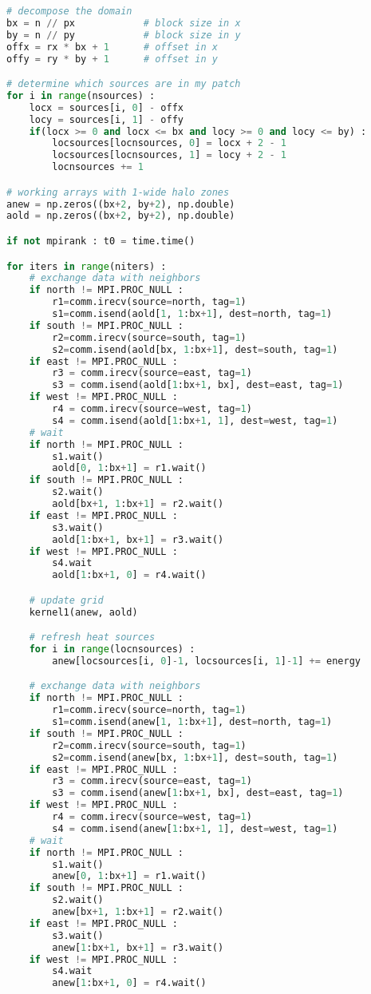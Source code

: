 \begin{lstlisting}[language=Python, caption={Parallel Numba-CPU implementation of the stencil test case.}]
# decompose the domain
bx = n // px            # block size in x
by = n // py            # block size in y
offx = rx * bx + 1      # offset in x
offy = ry * by + 1      # offset in y

# determine which sources are in my patch
for i in range(nsources) :
    locx = sources[i, 0] - offx
    locy = sources[i, 1] - offy
    if(locx >= 0 and locx <= bx and locy >= 0 and locy <= by) :
        locsources[locnsources, 0] = locx + 2 - 1
        locsources[locnsources, 1] = locy + 2 - 1
        locnsources += 1

# working arrays with 1-wide halo zones
anew = np.zeros((bx+2, by+2), np.double)
aold = np.zeros((bx+2, by+2), np.double)

if not mpirank : t0 = time.time()

for iters in range(niters) :
    # exchange data with neighbors
    if north != MPI.PROC_NULL :
        r1=comm.irecv(source=north, tag=1)
        s1=comm.isend(aold[1, 1:bx+1], dest=north, tag=1)
    if south != MPI.PROC_NULL :
        r2=comm.irecv(source=south, tag=1)
        s2=comm.isend(aold[bx, 1:bx+1], dest=south, tag=1)
    if east != MPI.PROC_NULL :
        r3 = comm.irecv(source=east, tag=1)
        s3 = comm.isend(aold[1:bx+1, bx], dest=east, tag=1)
    if west != MPI.PROC_NULL :
        r4 = comm.irecv(source=west, tag=1)
        s4 = comm.isend(aold[1:bx+1, 1], dest=west, tag=1)
    # wait
    if north != MPI.PROC_NULL :
        s1.wait()
        aold[0, 1:bx+1] = r1.wait()
    if south != MPI.PROC_NULL :
        s2.wait()
        aold[bx+1, 1:bx+1] = r2.wait()
    if east != MPI.PROC_NULL :
        s3.wait()
        aold[1:bx+1, bx+1] = r3.wait()
    if west != MPI.PROC_NULL :
        s4.wait
        aold[1:bx+1, 0] = r4.wait()

    # update grid
    kernel1(anew, aold)

    # refresh heat sources
    for i in range(locnsources) :
        anew[locsources[i, 0]-1, locsources[i, 1]-1] += energy

    # exchange data with neighbors
    if north != MPI.PROC_NULL :
        r1=comm.irecv(source=north, tag=1)
        s1=comm.isend(anew[1, 1:bx+1], dest=north, tag=1)
    if south != MPI.PROC_NULL :
        r2=comm.irecv(source=south, tag=1)
        s2=comm.isend(anew[bx, 1:bx+1], dest=south, tag=1)
    if east != MPI.PROC_NULL :
        r3 = comm.irecv(source=east, tag=1)
        s3 = comm.isend(anew[1:bx+1, bx], dest=east, tag=1)
    if west != MPI.PROC_NULL :
        r4 = comm.irecv(source=west, tag=1)
        s4 = comm.isend(anew[1:bx+1, 1], dest=west, tag=1)
    # wait
    if north != MPI.PROC_NULL :
        s1.wait()
        anew[0, 1:bx+1] = r1.wait()
    if south != MPI.PROC_NULL :
        s2.wait()
        anew[bx+1, 1:bx+1] = r2.wait()
    if east != MPI.PROC_NULL :
        s3.wait()
        anew[1:bx+1, bx+1] = r3.wait()
    if west != MPI.PROC_NULL :
        s4.wait
        anew[1:bx+1, 0] = r4.wait()


\end{lstlisting}
